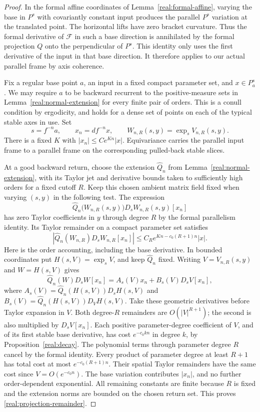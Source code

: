 \begin{proof}
In the formal affine coordinates of
Lemma~\ref{real:formal-affine}, varying the base in $P^s$ with
covariantly constant input produces the parallel $P^s$ variation
at the translated point. The horizontal lifts have zero bracket
curvature. Thus the formal derivative of $\mathcal F$ in such a
base direction is annihilated by the formal projection $Q$ onto
the perpendicular of $P^s$. This identity only uses the first
derivative of the input in that base direction. It therefore
applies to our actual parallel frame by axis coherence.

Fix a regular base point $a$, an input in a fixed compact
parameter set, and $x\in P^s_a$. We may require $a$ to be
backward recurrent to the positive-measure sets in
Lemma~\ref{real:normal-extension} for every finite pair of orders.
This is a conull condition by ergodicity, and holds for a dense
set of points on each of the typical stable axes in use. Set
\[
 s=f^{-n}a,\qquad x_n=df^{-n}x,
 \qquad
 W_{n,R}(s,y)=\exp_s V_{n,R}(s,y).
\]
There is a fixed $K$ with $|x_n|\le C e^{Kn}|x|$.
Equivariance carries the parallel input frame to a parallel frame
on the corresponding pulled-back stable slices.

At a good backward return, choose the extension $\widehat Q_n$
from Lemma~\ref{real:normal-extension}, with its Taylor jet and
derivative bounds taken to sufficiently high orders for a fixed
cutoff $R$. Keep this chosen ambient matrix field fixed when varying
$(s,y)$ in the following test. The expression
\[
 \widehat Q_n\bigl(W_{n,R}(s,y)\bigr)
          D_sW_{n,R}(s,y)[x_n]
\]
has zero Taylor coefficients in $y$ through degree $R$ by the
formal parallelism identity. Its Taylor remainder on a compact
parameter set satisfies
\begin{equation}\label{real:projection-remainder}
 \left|\widehat Q_n(W_{n,R})D_sW_{n,R}[x_n]\right|
     \le C_R e^{Kn-c_0(R+1)n}|x|.
\end{equation}
Here is the order accounting, including the base derivative.
In bounded coordinates put $H(s,V)=\exp_s V$, and keep
$\widehat Q_n$ fixed. Writing $V=V_{n,R}(s,y)$ and $W=H(s,V)$ gives
\[
 \widehat Q_n(W)D_sW[x_n]
   =A_s(V)x_n+B_s(V)D_sV[x_n],
\]
where $A_s(V)=\widehat Q_n(H(s,V))D_sH(s,V)$ and
$B_s(V)=\widehat Q_n(H(s,V))D_VH(s,V)$.
Take these geometric derivatives before Taylor expansion in $V$.
Both degree-$R$ remainders are $O(|V|^{R+1})$; the second is also
multiplied by $D_sV[x_n]$. Each positive parameter-degree
coefficient of $V$, and of its first stable base derivative,
has cost $e^{-c_0kn}$ in degree $k$, by
Proposition~\ref{real:decay}. The polynomial terms through parameter
degree $R$ cancel by the formal identity.
Every product of parameter degree at least $R+1$ has total cost
at most $e^{-c_0(R+1)n}$. Their spatial Taylor remainders have the
same cost since $V=O(e^{-c_0n})$.
The base variation contributes $|x_n|$, and no further
order-dependent exponential. All remaining constants are finite
because $R$ is fixed and the extension norms are bounded on the
chosen return set. This proves
\eqref{real:projection-remainder}.


\end{proof}
